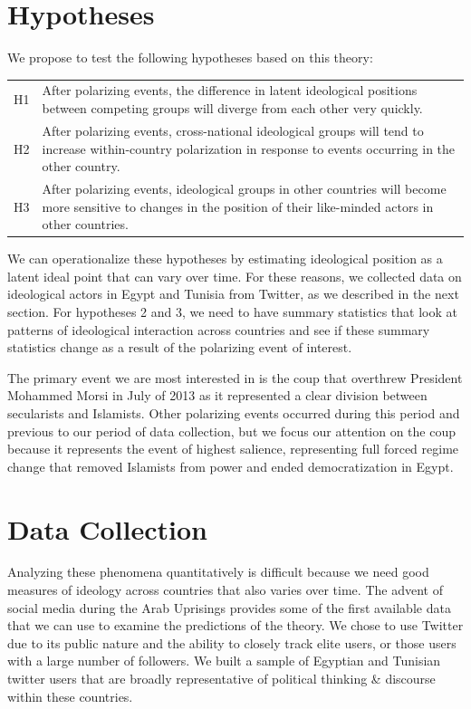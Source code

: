 \documentclass[12pt]{article}
\begin{document}
\section*{Hypotheses}

We propose to test the following hypotheses based on this theory:

\begin{tabular}{lp{15cm}}
	H1 & After polarizing events, the difference in latent ideological positions between competing groups will diverge from each other very quickly.\\
	H2 & After polarizing events, cross-national ideological groups will tend to increase within-country polarization in response to events occurring in the other country.\\
	H3 & After polarizing events, ideological groups in other countries will become more sensitive to changes in the position of their like-minded actors in other countries.
\end{tabular}

We can operationalize these hypotheses by estimating ideological position as a latent ideal point that can vary over time. For these reasons, we collected data on ideological actors in Egypt and Tunisia from Twitter, as we described in the next section. For hypotheses 2 and 3, we need to have summary statistics that look at patterns of ideological interaction across countries and see if these summary statistics change as a result of the polarizing event of interest. 

The primary event we are most interested in is the coup that overthrew President Mohammed Morsi in July of 2013 as it represented a clear division between secularists and Islamists. Other polarizing events occurred during this period and previous to our period of data collection, but we focus our attention on the coup because it represents the event of highest salience, representing full forced regime change that removed Islamists from power and ended democratization in Egypt.
 
\section*{Data Collection}
Analyzing these phenomena quantitatively is difficult because we need good measures of ideology across countries that also varies over time. The advent of social media during the Arab Uprisings provides some of the first available data that we can use to examine the predictions of the theory. We chose to use Twitter due to its public nature and the ability to closely track elite users, or those users with a large number of followers. We built a sample of Egyptian and Tunisian twitter users that are broadly representative of political thinking \& discourse within these countries.
\end{document}
